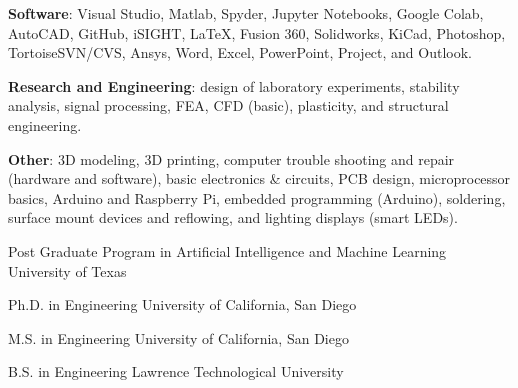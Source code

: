 \documentclass{leresume}
\begin{document}
\begin{bulletedlist}
		\item \textbf{Software}: Visual Studio,
                        Matlab,
                        Spyder,
                        Jupyter Notebooks,
                        Google Colab,
                        AutoCAD,
                        GitHub,
                        iSIGHT,
                        LaTeX,
                        Fusion 360,
                        Solidworks,
                        KiCad,
                        Photoshop,
                        TortoiseSVN/CVS,
                        Ansys,
                        Word,
                        Excel,
                        PowerPoint,
                        Project,
                        and Outlook.
                        
		\item \textbf{Research and Engineering}: design of laboratory experiments,
                        stability analysis,
                        signal processing,
                        FEA,
                        CFD (basic),
                        plasticity,
                        and structural engineering.
                        
		\item \textbf{Other}: 3D modeling,
                        3D printing,
                        computer trouble shooting and repair (hardware and software),
                        basic electronics \& circuits,
                        PCB design,
                        microprocessor basics,
                        Arduino and Raspberry Pi,
                        embedded programming (Arduino),
                        soldering,
                        surface mount devices and reflowing,
                        and lighting displays (smart LEDs).
                        
	\end{bulletedlist}

	
                {Post Graduate Program in Artificial Intelligence and Machine Learning}
                {University of Texas}
		
                {Ph.D. in Engineering}
                {University of California, San Diego}
		
                {M.S. in Engineering}
                {University of California, San Diego}
		
                {B.S. in Engineering}
                {Lawrence Technological University}
		

    
\end{document}
